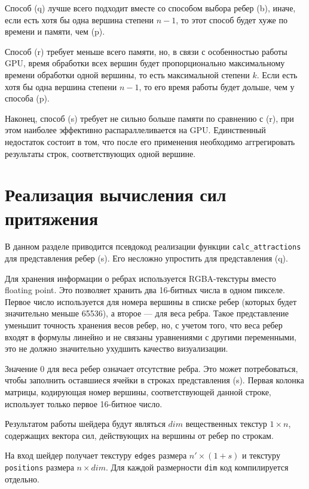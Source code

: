 Способ (q) лучше всего подходит вместе со способом выбора ребер (b), иначе, если есть хотя бы одна вершина степени $n-1$, то этот способ будет хуже по времени и памяти, чем (p).

Способ (r) требует меньше всего памяти, но, в связи с особенностью работы GPU, время обработки всех вершин будет пропорционально максимальному времени обработки одной вершины, то есть максимальной степени $k$. Если есть хотя бы одна вершина степени $n - 1$, то его время работы будет дольше, чем у способа (p).

Наконец, способ (s) требует не сильно больше памяти по сравнению с (r), при этом наиболее эффективно распараллеливается на GPU. Единственный недостаток состоит в том, что после его применения необходимо аггрегировать результаты строк, соответствующих одной вершине.

\section{Реализация вычисления сил притяжения}
\label{sec:attractions_implementation}

В данном разделе приводится псевдокод реализации функции \texttt{calc\_attractions} для представления ребер (s). Его несложно упростить для представления (q).

Для хранения информации о ребрах используется RGBA-текстуры вместо floating point. Это позволяет хранить два 16-битных числа в одном пикселе. Первое число используется для номера вершины в списке ребер (которых будет значительно меньше 65536), а второе --- для веса ребра. Такое представление уменьшит точность хранения весов ребер, но, с учетом того, что веса ребер входят в формулы линейно и не связаны уравнениями с другими переменными, это не должно значительно ухудшить качество визуализации.

Значение 0 для веса ребер означает отсутствие ребра. Это может потребоваться, чтобы заполнить оставшиеся ячейки в строках представления (s). Первая колонка матрицы, кодирующая номер вершины, соответствующей данной строке, использует только первое 16-битное число.

Результатом работы шейдера будут являться $dim$ вещественных текстур $1\times n$, содержащих вектора сил, действующих на вершины от ребер по строкам.

На вход шейдер получает текстуру \texttt{edges} размера $n'\times(1 + s)$ и текстуру \texttt{positions} размера $n\times dim$. Для каждой размерности \texttt{dim} код компилируется отдельно.

